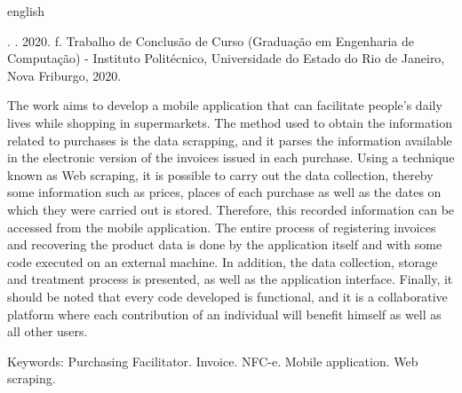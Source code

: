 
\begin{resumo}[Abstract]
\begin{otherlanguage*}{english}

\noindent
\entradaAutor{}. \textit{\englishTitle{}}. 2020. \pageref{LastPage} f. Trabalho de Conclusão de Curso (Graduação em Engenharia de Computação) - Instituto Politécnico, Universidade do Estado do Rio de Janeiro, Nova Friburgo, 2020.
\vspace{\onelineskip}

\setlength{\parindent}{1.3cm}
The work aims to develop a mobile application that can facilitate people's daily lives while shopping in supermarkets. The method used to obtain the information related to purchases is the data scrapping, and it parses the information available in the electronic version of the invoices issued in each purchase. Using a technique known as Web scraping, it is possible to carry out the data collection, thereby some information such as prices, places of each purchase as well as the dates on which they were carried out is stored. Therefore, this recorded information can be accessed from the mobile application. The entire process of registering invoices and recovering the product data is done by the application itself and with some code executed on an external machine. In addition, the data collection, storage and treatment process is presented, as well as the application interface. Finally, it should be noted that every code developed is functional, and it is a collaborative platform where each contribution of an individual will benefit himself as well as all other users.

\vspace{\onelineskip}
\noindent Keywords: Purchasing Facilitator. Invoice. NFC-e. Mobile application. Web scraping.

\end{otherlanguage*}
\end{resumo}